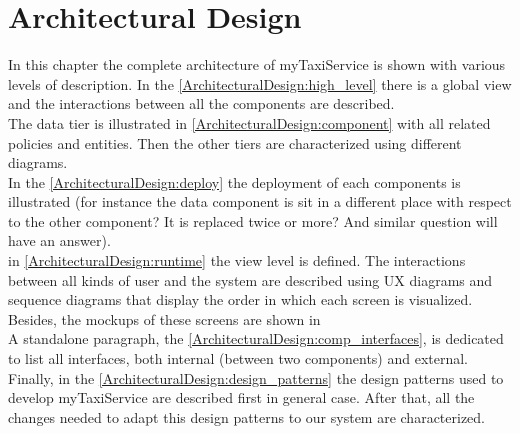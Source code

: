 \documentclass[../dd]{subfiles}
\begin{document}
\chapter{Architectural Design}
\label{architectural_design}

\setmyfancystyle

In this chapter the complete architecture of myTaxiService is shown with various levels of description. In the \autoref{ArchitecturalDesign:high_level} there is a global view and the interactions between all the components are described.\\ 
The data tier is illustrated in \autoref{ArchitecturalDesign:component} with all related policies and entities. Then the other tiers are characterized using different diagrams.\\
In the \autoref{ArchitecturalDesign:deploy} the deployment of each components is illustrated (for instance the data component is sit in a different place with respect to the other component? It is replaced twice or more? And similar question will have an answer).\\
in \autoref{ArchitecturalDesign:runtime} the view level is defined. The interactions between all kinds of user and the system are described using UX diagrams and sequence diagrams that display the order in which each screen is visualized. Besides, the mockups of these screens are shown in %
\\
A standalone paragraph, the \autoref{ArchitecturalDesign:comp_interfaces}, is dedicated to list all interfaces, both internal (between two components) and external.\\
Finally, in the \autoref{ArchitecturalDesign:design_patterns} the design patterns used to develop myTaxiService are described first in general case. After that, all the changes needed to adapt this design patterns to our system are characterized.
\end{document}
